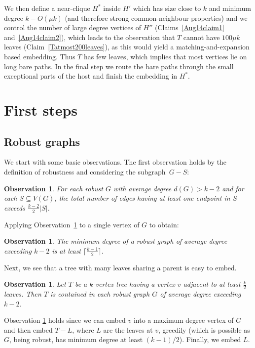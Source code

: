 \documentclass[12pt]{article}
\newtheorem{observation}[theorem]{Observation}
\begin{document}
We then define a near-clique   $H^*$ inside $H'$ which has size close to $k$ and minimum degree $k-O(\mu k)$ (and therefore strong
common-neighbour properties) and we control the number of large degree vertices of  $H''$ (Claims~\ref{Aug14claim1} and~\ref{Aug14claim2}), which leads to the observation that $T$ cannot have $100\mu k$ leaves
(Claim~\ref{Tatmost200leaves}), as this would yield a matching-and-expansion based embedding.
Thus $T$ has few leaves, which implies that most vertices lie on long bare paths. In the final step we route
the bare paths through the small exceptional parts of the host
and finish the embedding in $H^*$.







\section{First steps}
\label{prelims}


\subsection{Robust graphs}
We start with some basic observations.
The 
first observation holds by the definition of robustness and considering the subgraph~$G-S$:
 
\begin{observation}\label{minimalityOfG}
For each robust  $G$ with average degree   $d(G)>k-2$ and for each $S\subseteq V(G)$,  the total number of edges having at least one endpoint in $S$  exceeds $\frac{k-2}2 |S|$.
\end{observation}

Applying Observation~\ref{minimalityOfG} to a single vertex of $G$ to obtain:
\begin{observation}\label{minDegofG}
The minimum degree of a robust graph
 of average degree exceeding $k-2$ is at least $\lceil \frac{k-1}{2}\rceil$.
 \end{observation}

 Next, we see that a tree with many leaves sharing a parent is easy to embed.

\begin{observation}\label{fewleaves}
Let $T$ be a $k$-vertex tree  having a vertex $v$ adjacent to at least $\frac k2$ leaves. Then $T$ is contained  in each robust graph $G$ of average degree exceeding $k-2$.
\end{observation}
Observation \ref{fewleaves} holds since we can embed $v$ into a maximum degree vertex of $G$ and then embed  $T-L$, where $L$ are the leaves at $v$, greedily (which is possible as $G$, being robust, has minimum degree at least $(k-1)/2$). Finally, we embed $L$.
\end{document}

